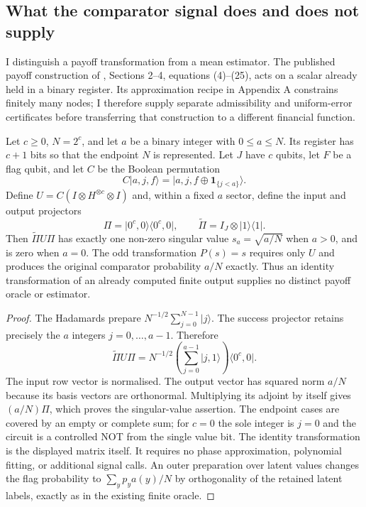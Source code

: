 \subsection{What the comparator signal does and does not supply}
\label{sec:qsp-applicability-audit}

I distinguish a payoff transformation from a mean estimator. The published
payoff construction of \citet{stamatopoulos}, Sections 2--4,
equations (4)--(25), acts on a scalar already held in a binary register.
Its approximation recipe in Appendix A constrains finitely many nodes;
I therefore supply separate admissibility and uniform-error certificates
before transferring that construction to a different financial function.

\begin{proposition}
\label{prop:comparator-qsp-identity}
Let $c\geq0$, $N=2^c$, and let $a$ be a binary integer with
$0\leq a\leq N$. Its register has $c+1$ bits so that the endpoint $N$
is represented. Let $J$ have $c$ qubits, let $F$ be a flag qubit, and
let $C$ be the Boolean permutation
\[
 C\lvert a,j,f\rangle
   =\lvert a,j,f\mathbin\oplus\mathbf1_{\{j<a\}}\rangle.
\]
Define $U=C(I\otimes H^{\otimes c}\otimes I)$ and, within a fixed
$a$ sector, define the input and output projectors
\[
 \Pi=\lvert0^c,0\rangle\langle0^c,0\rvert,
 \qquad \widetilde\Pi=I_J\otimes\lvert1\rangle\langle1\rvert.
\]
Then $\widetilde\Pi U\Pi$ has exactly one non-zero singular value
$s_a=\sqrt{a/N}$ when $a>0$, and is zero when $a=0$.
The odd transformation $P(s)=s$ requires only $U$ and produces
the original comparator probability $a/N$ exactly. Thus an identity
transformation of an already computed finite output supplies no
distinct payoff oracle or estimator.
\end{proposition}

\begin{proof}
The Hadamards prepare $N^{-1/2}\sum_{j=0}^{N-1}\lvert j\rangle$.
The success projector retains precisely the $a$ integers
$j=0,\ldots,a-1$. Therefore
\[
 \widetilde\Pi U\Pi
 =N^{-1/2}\left(\sum_{j=0}^{a-1}\lvert j,1\rangle\right)
       \langle0^c,0\rvert.
\]
The input row vector is normalised. The output vector has squared norm
$a/N$ because its basis vectors are orthonormal. Multiplying its adjoint
by itself gives $(a/N)\Pi$, which proves the singular-value assertion.
The endpoint cases are covered by an empty or complete sum; for $c=0$
the sole integer is $j=0$ and the circuit is a controlled NOT from the
single value bit. The identity transformation is the displayed matrix
itself. It requires no phase approximation, polynomial fitting, or
additional signal calls. An outer preparation over latent values changes
the flag probability to $\sum_y p_y a(y)/N$ by orthogonality of the
retained latent labels, exactly as in the existing finite oracle.
\end{proof}

